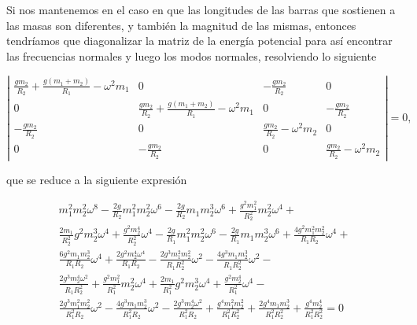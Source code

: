 \documentclass[a4paper,10pt]{article}
\numberwithin{equation}{section}
\begin{document}
Si nos mantenemos en el caso en que las longitudes de las barras que sostienen a las 
masas son diferentes, y también la magnitud de las mismas, entonces tendríamos que 
diagonalizar la matriz de la energía potencial para así encontrar las frecuencias 
normales y luego los modos normales, resolviendo lo siguiente 

\begin{equation}
 \left| \begin{matrix}
      \frac{gm_2}{R_2} + \frac{g(m_1 + m_2)}{R_1} - \omega^2m_1 & 0 & - \frac{gm_2}{R_2} & 0 \\
      0 & \frac{gm_2}{R_2} + \frac{g(m_1 + m_2)}{R_1} - \omega^2m_1 & 0 & - \frac{gm_2}{R_2} \\
      - \frac{gm_2}{R_2} & 0 & \frac{gm_2}{R_2} - \omega^2m_2 & 0 \\
      0 & - \frac{gm_2}{R_2} & 0 & \frac{gm_2}{R_2} - \omega^2m_2
        \end{matrix}\right| = 0,
\end{equation}

que se reduce a la siguiente expresión

\begin{align*}
 m_{1}^{2} m_{2}^{2} \omega^{8} - \frac{2 g}{R_{2}} m_{1}^{2} m_{2}^{2} \omega^{6} -
 \frac{2 g}{R_{2}} m_{1} m_{2}^{3} \omega^{6} + \frac{g^{2} m_{1}^{2}}{R_{2}^{2}} m_{2}^{2} \omega^{4} + \\
 \frac{2 m_{1}}{R_{2}^{2}} g^{2} m_{2}^{3} \omega^{4} + \frac{g^{2} m_{2}^{4}}{R_{2}^{2}} \omega^{4} - 
 \frac{2 g}{R_{1}} m_{1}^{2} m_{2}^{2} \omega^{6} - \frac{2 g}{R_{1}} m_{1} m_{2}^{3} \omega^{6} + 
 \frac{4 g^{2} m_{1}^{2} m_{2}^{2}}{R_{1} R_{2}} \omega^{4} + \\
 \frac{6 g^{2} m_{1} m_{2}^{3}}{R_{1} R_{2}} \omega^{4} + 
 \frac{2 g^{2} m_{2}^{4} \omega^{4}}{R_{1} R_{2}} - 
 \frac{2 g^{3} m_{1}^{2} m_{2}^{2}}{R_{1} R_{2}^{2}} \omega^{2} - 
 \frac{4 g^{3} m_{1} m_{2}^{3}}{R_{1} R_{2}^{2}} \omega^{2} - \\
 \frac{2 g^{3} m_{2}^{4} \omega^{2}}{R_{1} R_{2}^{2}} + 
 \frac{g^{2} m_{1}^{2}}{R_{1}^{2}} m_{2}^{2} \omega^{4} + 
 \frac{2 m_{1}}{R_{1}^{2}} g^{2} m_{2}^{3} \omega^{4} + 
 \frac{g^{2} m_{2}^{4}}{R_{1}^{2}} \omega^{4} - \\
 \frac{2 g^{3} m_{1}^{2} m_{2}^{2}}{R_{1}^{2} R_{2}} \omega^{2} - 
 \frac{4 g^{3} m_{1} m_{2}^{3}}{R_{1}^{2} R_{2}} \omega^{2} - 
 \frac{2 g^{3} m_{2}^{4} \omega^{2}}{R_{1}^{2} R_{2}} + 
 \frac{g^{4} m_{1}^{2} m_{2}^{2}}{R_{1}^{2} R_{2}^{2}} + 
 \frac{2 g^{4} m_{1} m_{2}^{3}}{R_{1}^{2} R_{2}^{2}} + 
 \frac{g^{4} m_{2}^{4}}{R_{1}^{2} R_{2}^{2}} = 0
\end{align*}
\end{document}
